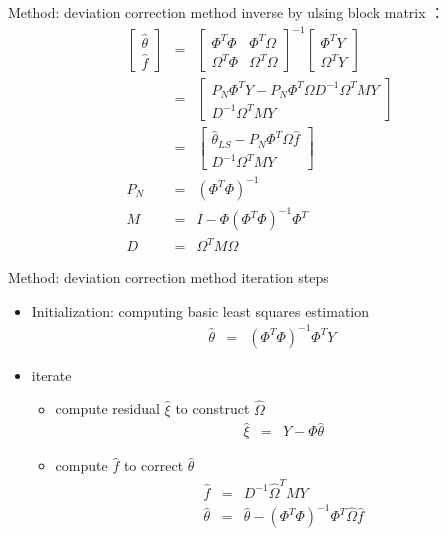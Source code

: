 \begin{frame}{ Method: deviation correction method }
inverse by ulsing block matrix ：
\begin{eqnarray*}
\begin{bmatrix}\hat\theta \\ \hat f \end{bmatrix} &=& \begin{bmatrix}\Phi^T\Phi & \Phi^T\Omega \\ \Omega^T\Phi & \Omega^T\Omega \end{bmatrix}^{-1}\begin{bmatrix}\Phi^T Y \\ \Omega^T Y\end{bmatrix} \\
&=& \begin{bmatrix}P_N \Phi^T Y - P_N\Phi^T \Omega D^{-1} \Omega^T M Y \\ D^{-1}\Omega^T M Y\end{bmatrix} \\
&=& \begin{bmatrix}\hat\theta_{LS} - P_N\Phi^T \Omega \hat f \\ D^{-1}\Omega^T M Y\end{bmatrix} \\
P_N &=& (\Phi^T\Phi)^{-1} \\
M &=& I-\Phi(\Phi^T\Phi)^{-1}\Phi^T \\
D &=& \Omega^T M \Omega
\end{eqnarray*}
\end{frame}


\begin{frame}{ Method:  deviation correction method  iteration steps }
\begin{itemize}
\item  Initialization: computing basic least squares estimation 
\begin{eqnarray*}
\hat\theta &=& (\Phi^T\Phi)^{-1} \Phi^T Y
\end{eqnarray*}
\item iterate
\begin{itemize}
\item compute residual $\hat\xi$ to construct $\hat\Omega$
\begin{eqnarray*}
\hat\xi &=& Y- \Phi\hat\theta
\end{eqnarray*}
\item compute $\hat f$ to correct $\hat\theta$
\begin{eqnarray*}
\hat f &=& D^{-1}\hat\Omega^T M Y \\
\hat\theta &=& \hat\theta-(\Phi^T\Phi)^{-1} \Phi^T \hat\Omega \hat f
\end{eqnarray*}
\end{itemize}
\end{itemize}
\end{frame}


